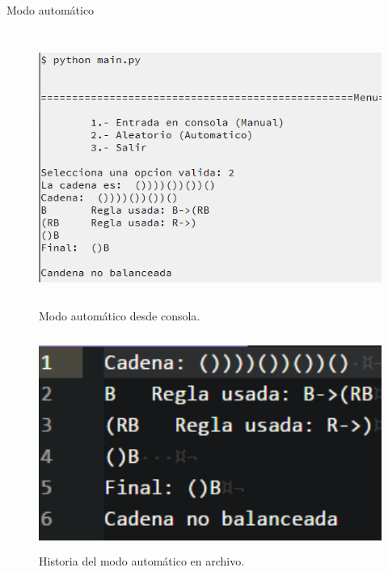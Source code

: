 	{\large Modo automático}
	\begin{figure}[H]
		\begin{center}
			\includegraphics[width=\linewidth, height=9cm]{img/parseo-automatico-consola.png}
			\caption{Modo automático desde consola.}
			\label{fig:parseo3}
		\end{center}
	\end{figure}
	\begin{figure}[H]
		\begin{center}
			\includegraphics[width=12cm, height=7cm]{img/parseo-automatico-archivo.png}
			\caption{Historia del modo automático en archivo.}
			\label{fig:parseo4}
		\end{center}
	\end{figure}
